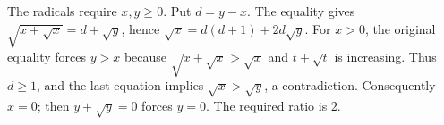 The radicals require $x,y\ge0$. Put $d=y-x$. The equality gives $\sqrt{x+\sqrt x}=d+\sqrt y$, hence $\sqrt x=d(d+1)+2d\sqrt y$. For $x>0$, the original equality forces $y>x$ because $\sqrt{x+\sqrt x}>\sqrt x$ and $t+\sqrt t$ is increasing. Thus $d\ge1$, and the last equation implies $\sqrt x>\sqrt y$, a contradiction. Consequently $x=0$; then $y+\sqrt y=0$ forces $y=0$. The required ratio is $\boxed2$.
